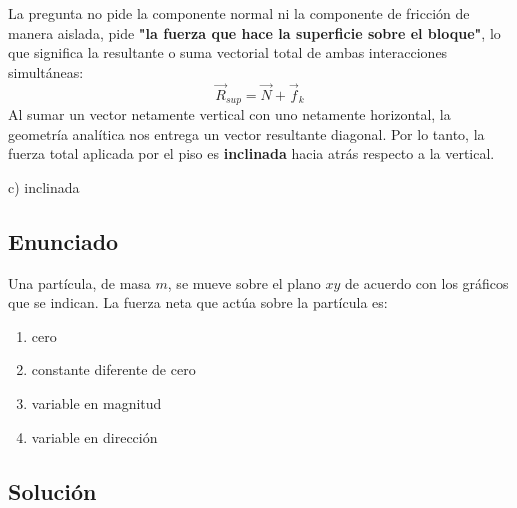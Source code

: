 \documentclass[12pt, a4paper]{article}
\begin{document}
La pregunta no pide la componente normal ni la componente de fricción de manera aislada, pide \textbf{"la fuerza que hace la superficie sobre el bloque"}, lo que significa la resultante o suma vectorial total de ambas interacciones simultáneas:
$$ \vec{R}_{sup} = \vec{N} + \vec{f}_k $$
Al sumar un vector netamente vertical con uno netamente horizontal, la geometría analítica nos entrega un vector resultante diagonal. Por lo tanto, la fuerza total aplicada por el piso es \textbf{inclinada} hacia atrás respecto a la vertical.

\begin{tcolorbox}[colback=green!5!white, colframe=green!50!black, title=Respuesta Final]
\centering \Large c) inclinada
\end{tcolorbox}

\newpage

\subsection*{Enunciado}
Una partícula, de masa $m$, se mueve sobre el plano $xy$ de acuerdo con los gráficos que se indican. La fuerza neta que actúa sobre la partícula es:

\begin{center}
\end{center}

\begin{enumerate}[label=\alph*)]
    \item cero
    \item constante diferente de cero
    \item variable en magnitud
    \item variable en dirección
\end{enumerate}

\subsection*{Solución}
\end{document}
